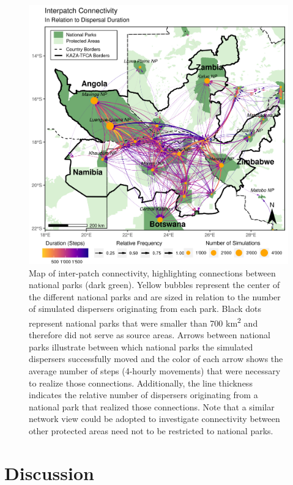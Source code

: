 \documentclass[abstract=on,10pt,a4paper,bibliography=totocnumbered]{article}
\begin{document}
\begin{figure}
  \includegraphics[width=\textwidth]{99_AreasReached.png}
  \caption{Map of inter-patch connectivity, highlighting connections between
  national parks (dark green). Yellow bubbles represent the center of the
  different national parks and are sized in relation to the number of simulated
  dispersers originating from each park. Black dots represent national parks
  that were smaller than 700 km\textsuperscript{2} and therefore did not serve
  as source areas. Arrows between national parks illustrate between which
  national parks the simulated dispersers successfully moved and the color of
  each arrow shows the average number of steps (4-hourly movements) that were
  necessary to realize those connections. Additionally, the line thickness
  indicates the relative number of dispersers originating from a national park
  that realized those connections. Note that a similar network view could be
  adopted to investigate connectivity between other protected areas need not to
  be restricted to national parks.}
  \label{AreasReached}
\end{figure}

\section{Discussion}
\end{document}
